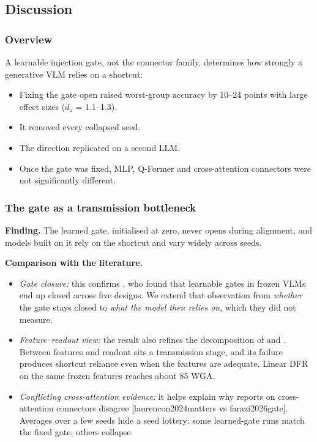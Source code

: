 \subsection{Discussion}

\subsubsection{Overview}

A learnable injection gate, not the connector family, determines how strongly a generative VLM relies on a
shortcut:

\begin{itemize}
\tightlist
\item
  Fixing the gate open raised worst-group accuracy by 10--24 points with large effect sizes (\(d_z\) = 1.1--1.3).
\item
  It removed every collapsed seed.
\item
  The direction replicated on a second LLM.
\item
  Once the gate was fixed, MLP, Q-Former and cross-attention connectors were not significantly different.
\end{itemize}

\subsubsection{The gate as a transmission bottleneck}

\textbf{Finding.} The learned gate, initialised at zero, never opens during alignment, and models built on it rely
on the shortcut and vary widely across seeds.

\textbf{Comparison with the literature.}

\begin{itemize}
\item
  \emph{Gate closure:} this confirms \cite{farazi2026gate}, who found that learnable gates in frozen VLMs end up closed
  across five designs. We extend that observation from \emph{whether} the gate stays closed to \emph{what the model then
  relies on}, which they did not measure.
\item
  \emph{Feature--readout view:} the result also refines the decomposition of \cite{izmailov2022feature} and
  \cite{kirichenko2023dfr}. Between features and readout sits a transmission stage, and its failure produces
  shortcut reliance even when the features are adequate. Linear DFR on the same frozen features reaches about
  85 WGA.
\item
  \emph{Conflicting cross-attention evidence:} it helps explain why reports on cross-attention connectors disagree
  {[}laurencon2024matters vs farazi2026gate{]}. Averages over a few seeds hide a seed lottery: some learned-gate
  runs match the fixed gate, others collapse.
\end{itemize}

